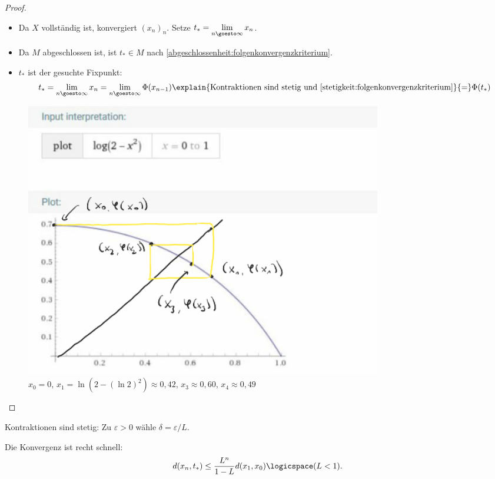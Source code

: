 \begin{proof}
\begin{proofdescription}
\begin{subproof}
\begin{itemize}
                \item Da \( X\) vollständig ist, konvergiert \( (x_n)_n\). Setze \( t_*=\lim\limits_{n \goesto \infty} x_n\).
                \item Da \( M\) abgeschlossen ist, ist \( t_*\in M\) nach \ref{abgeschlossenheit:folgenkonvergenzkriterium}.
                \item \( t_*\) ist der gesuchte Fixpunkt:
                \begin{align*}
                    t_*=\lim\limits_{n \goesto \infty} x_n=\lim\limits_{n \goesto \infty} \Phi(x_{n-1})\explain{\text{Kontraktionen sind stetig und \ref{stetigkeit:folgenkonvergenzkriterium}}}{=}\Phi(t_*)
                \end{align*} 
            \end{itemize}
        \begin{figure}[H]
            \centering
            \includegraphics[width=0.6\linewidth]{figures/fixpunktsatz_beweis_existenz}
            \caption*{\( x_0=0\), \( x_1=\ln(2-(\ln 2)^2)\approx 0,42\), \( x_3\approx 0,60\), \( x_4\approx 0,49\)   }
            \label{fig:fixpunktsatz_beweis_existenz}
        \end{figure}
        
        \end{subproof}
        
           
    \end{proofdescription}
    
    
\end{proof}
\begin{bemerkung*}
    Kontraktionen sind stetig: Zu \( \varepsilon>0\) wähle \( \delta=\varepsilon/L\).
\end{bemerkung*}
\begin{bemerkung*}
    Die Konvergenz ist recht schnell:
    \begin{align*}
        d(x_n,t_*)\leq \frac{L^n}{1-L}d(x_1,x_0)\logicspace (L<1).
    \end{align*}
\end{bemerkung*}

